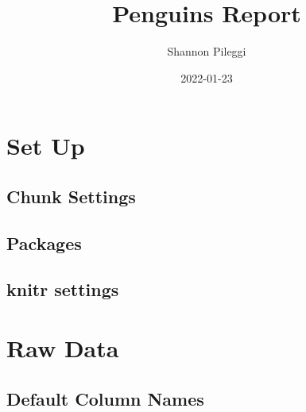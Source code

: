 \documentclass[
  landscape]{article}
\title{Penguins Report}
\author{Shannon Pileggi}
\date{2022-01-23}
\begin{document}
\maketitle

\newpage{}

{
\setcounter{tocdepth}{2}
\tableofcontents
}
\let\oldsection\section
\renewcommand\section{\clearpage\oldsection}

\hypertarget{set-up}{%
\section{Set Up}\label{set-up}}

\hypertarget{chunk-settings}{%
\subsection{Chunk Settings}\label{chunk-settings}}

\hypertarget{packages}{%
\subsection{Packages}\label{packages}}

\hypertarget{knitr-settings}{%
\subsection{knitr settings}\label{knitr-settings}}

\hypertarget{raw-data}{%
\section{Raw Data}\label{raw-data}}

\hypertarget{default-column-names}{%
\subsection{Default Column Names}\label{default-column-names}}
\end{document}
